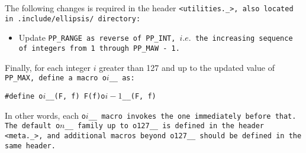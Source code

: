 The following changes is required in the header \tt{<utilities._>},
also located in \tt{.include/ellipsis/} directory:

\begin{itemize}

\item Update \tt{PP_RANGE} as reverse of \tt{PP_INT}, $i.e.$
the increasing sequence of integers from 1 through \tt{PP_MAW} - 1.

\end{itemize}

Finally, for each integer $i$ greater than 127 and up to the
updated value of \tt{PP_MAX}, define a macro \tt{o}$i$\_\_ as:

\begin{center}
\tt{#define o}$i$\tt{__(F, f) F(f)o}$i-1$\tt{__(F, f)}
\end{center}

In other words, each \tt{o}$i$\_\_ macro invokes the one immediately before that.
The default \tt{o}$n$\_\_ family up to \tt{o127__} is
defined in the header \tt{<meta._>}, and additional macros
beyond \tt{o127__} should be defined in the same header.
